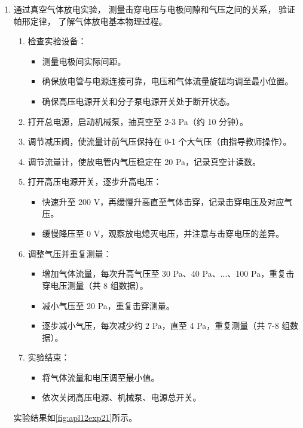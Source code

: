 \begin{enumerate}
	\item 通过真空气体放电实验， 测量击穿电压与电极间隙和气压之间的关系， 验证帕邢定律， 了解气体放电基本物理过程。
	\begin{enumerate}
		\item 检查实验设备：
		\begin{itemize}
			\item 测量电极间实际间距。
			\item 确保放电管与电源连接可靠，电压和气体流量旋钮均调至最小位置。
			\item 确保高压电源开关和分子泵电源开关处于断开状态。
		\end{itemize}
		\item 打开总电源，启动机械泵，抽真空至 2-3 Pa（约 10 分钟）。
		\item 调节减压阀，使流量计前气压保持在 0-1 个大气压（由指导教师操作）。
		\item 调节流量计，使放电管内气压稳定在 20 Pa，记录真空计读数。
		\item 打开高压电源开关，逐步升高电压：
		\begin{itemize}
			\item 快速升至 200 V，再缓慢升高直至气体击穿，记录击穿电压及对应气压。
			\item 缓慢降压至 0 V，观察放电熄灭电压，并注意与击穿电压的差异。
		\end{itemize}
		\item 调整气压并重复测量：
		\begin{itemize}
			\item 增加气体流量，每次升高气压至 30 Pa、40 Pa、...、100 Pa，重复击穿电压测量（共 8 组数据）。
			\item 减小气压至 20 Pa，重复击穿测量。
			\item 逐步减小气压，每次减少约 2 Pa，直至 4 Pa，重复测量（共 7-8 组数据）。
		\end{itemize}
		\item 实验结束：
		\begin{itemize}
			\item 将气体流量和电压调至最小值。
			\item 依次关闭高压电源、机械泵、电源总开关。
		\end{itemize}
	\end{enumerate}
	
	实验结果如\cref{fig:apl12exp21}所示。
	

\end{enumerate}
